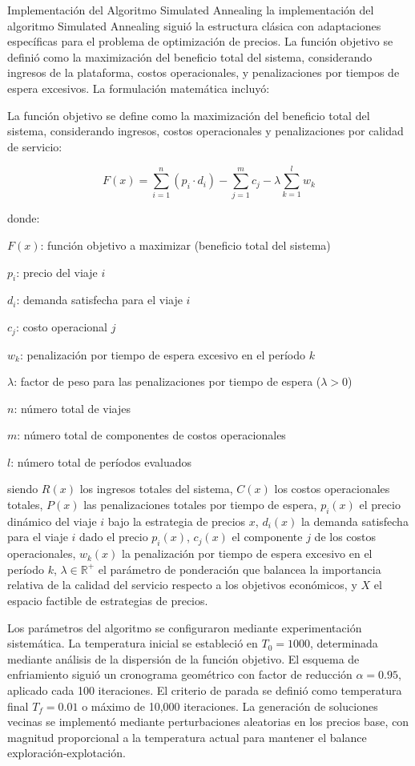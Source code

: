 \documentclass[conference]{IEEEtran}
\begin{document}
Implementación del Algoritmo Simulated Annealing la implementación del algoritmo Simulated Annealing siguió la estructura clásica con adaptaciones específicas para el problema de optimización de precios. La función objetivo se definió como la maximización del beneficio total del sistema, considerando ingresos de la plataforma, costos operacionales, y penalizaciones por tiempos de espera excesivos. La formulación matemática incluyó: 

La función objetivo se define como la maximización del beneficio total del sistema, considerando ingresos, costos operacionales y penalizaciones por calidad de servicio:

\begin{equation}
F(x) = \sum_{i=1}^{n} (p_i \cdot d_i) - \sum_{j=1}^{m} c_j - \lambda \sum_{k=1}^{l} w_k
\end{equation}

donde:

$F(x)$: función objetivo a maximizar (beneficio total del sistema)

$p_i$: precio del viaje $i$

$d_i$: demanda satisfecha para el viaje $i$

$c_j$: costo operacional $j$

$w_k$: penalización por tiempo de espera excesivo en el período $k$

$\lambda$: factor de peso para las penalizaciones por tiempo de espera ($\lambda > 0$)

$n$: número total de viajes

$m$: número total de componentes de costos operacionales

$l$: número total de períodos evaluados

siendo $R(x)$ los ingresos totales del sistema, $C(x)$ los costos operacionales totales, $P(x)$ las penalizaciones totales por tiempo de espera, $p_i(x)$ el precio dinámico del viaje $i$ bajo la estrategia de precios $x$, $d_i(x)$ la demanda satisfecha para el viaje $i$ dado el precio $p_i(x)$, $c_j(x)$ el componente $j$ de los costos operacionales, $w_k(x)$ la penalización por tiempo de espera excesivo en el período $k$, $\lambda \in \mathbb{R}^+$ el parámetro de ponderación que balancea la importancia relativa de la calidad del servicio respecto a los objetivos económicos, y $X$ el espacio factible de estrategias de precios.

Los parámetros del algoritmo se configuraron mediante experimentación sistemática. La temperatura inicial se estableció en $T_0 = 1000$, determinada mediante análisis de la dispersión de la función objetivo. El esquema de enfriamiento siguió un cronograma geométrico con factor de reducción $\alpha = 0.95$, aplicado cada 100 iteraciones. El criterio de parada se definió como temperatura final $T_f = 0.01$ o máximo de 10,000 iteraciones. La generación de soluciones vecinas se implementó mediante perturbaciones aleatorias en los precios base, con magnitud proporcional a la temperatura actual para mantener el balance exploración-explotación.
\end{document}

